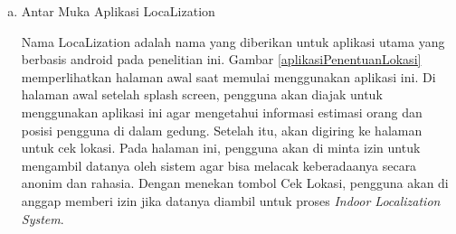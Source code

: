 \begin{enumerate}[a.]
	\item Antar Muka Aplikasi LocaLization

	      \par Nama LocaLization adalah nama yang diberikan untuk aplikasi utama yang berbasis android pada penelitian ini. Gambar \ref{aplikasiPenentuanLokasi} memperlihatkan halaman awal saat memulai menggunakan aplikasi ini. Di halaman awal setelah splash screen, pengguna akan diajak untuk menggunakan aplikasi ini agar mengetahui informasi estimasi orang dan posisi pengguna di dalam gedung. Setelah itu, akan digiring ke halaman untuk cek lokasi. Pada halaman ini, pengguna akan di minta izin untuk mengambil datanya oleh sistem agar bisa melacak keberadaanya secara anonim dan rahasia. Dengan menekan tombol Cek Lokasi, pengguna akan di anggap memberi izin jika datanya diambil untuk proses \textit{Indoor Localization System}.



\end{enumerate}
